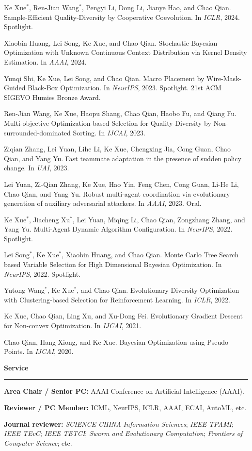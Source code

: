 \documentclass[10pt,a4paper]{article}
\newcommand{\cvsection}[1]{%
  \vspace{0.65em}%
  \noindent\textbf{\large #1}\\[-0.15em]
  \rule{\textwidth}{0.4pt}%
  \vspace{0.4em}%
}
\begin{document}
\begin{cvbullet}
  \item Ke Xue$^*$, Ren-Jian Wang$^*$, Pengyi Li, Dong Li, Jianye Hao, and Chao Qian. Sample-Efficient Quality-Diversity by Cooperative Coevolution. In \textit{ICLR}, 2024. Spotlight.
  \item Xiaobin Huang, Lei Song, Ke Xue, and Chao Qian. Stochastic Bayesian Optimization with Unknown Continuous Context Distribution via Kernel Density Estimation. In \textit{AAAI}, 2024.
  \item Yunqi Shi, Ke Xue, Lei Song, and Chao Qian. Macro Placement by Wire-Mask-Guided Black-Box Optimization. In \textit{NeurIPS}, 2023. Spotlight. 21st ACM SIGEVO Humies Bronze Award.
  \item Ren-Jian Wang, Ke Xue, Haopu Shang, Chao Qian, Haobo Fu, and Qiang Fu. Multi-objective Optimization-based Selection for Quality-Diversity by Non-surrounded-dominated Sorting. In \textit{IJCAI}, 2023.
  \item Ziqian Zhang, Lei Yuan, Lihe Li, Ke Xue, Chengxing Jia, Cong Guan, Chao Qian, and Yang Yu. Fast teammate adaptation in the presence of sudden policy change. In \textit{UAI}, 2023.
  \item Lei Yuan, Zi-Qian Zhang, Ke Xue, Hao Yin, Feng Chen, Cong Guan, Li-He Li, Chao Qian, and Yang Yu. Robust multi-agent coordination via evolutionary generation of auxiliary adversarial attackers. In \textit{AAAI}, 2023. Oral.
  \item Ke Xue$^*$, Jiacheng Xu$^*$, Lei Yuan, Miqing Li, Chao Qian, Zongzhang Zhang, and Yang Yu. Multi-Agent Dynamic Algorithm Configuration. In \textit{NeurIPS}, 2022. Spotlight.
  \item Lei Song$^*$, Ke Xue$^*$, Xiaobin Huang, and Chao Qian. Monte Carlo Tree Search based Variable Selection for High Dimensional Bayesian Optimization. In \textit{NeurIPS}, 2022. Spotlight.
  \item Yutong Wang$^*$, Ke Xue$^*$, and Chao Qian. Evolutionary Diversity Optimization with Clustering-based Selection for Reinforcement Learning. In \textit{ICLR}, 2022.
  \item Ke Xue, Chao Qian, Ling Xu, and Xu-Dong Fei. Evolutionary Gradient Descent for Non-convex Optimization. In \textit{IJCAI}, 2021.
  \item Chao Qian, Hang Xiong, and Ke Xue. Bayesian Optimization using Pseudo-Points. In \textit{IJCAI}, 2020.
\end{cvbullet}

\cvsection{Service}
\begin{cvbullet}
  \item \textbf{Area Chair / Senior PC:} AAAI Conference on Artificial Intelligence (AAAI).
  \item \textbf{Reviewer / PC Member:} ICML, NeurIPS, ICLR, AAAI, ECAI, AutoML, etc.
  \item \textbf{Journal reviewer:} \textit{SCIENCE CHINA Information Sciences}; \textit{IEEE TPAMI}; \textit{IEEE TEvC}; \textit{IEEE TETCI}; \textit{Swarm and Evolutionary Computation}; \textit{Frontiers of Computer Science}; etc.
\end{cvbullet}
\end{document}
